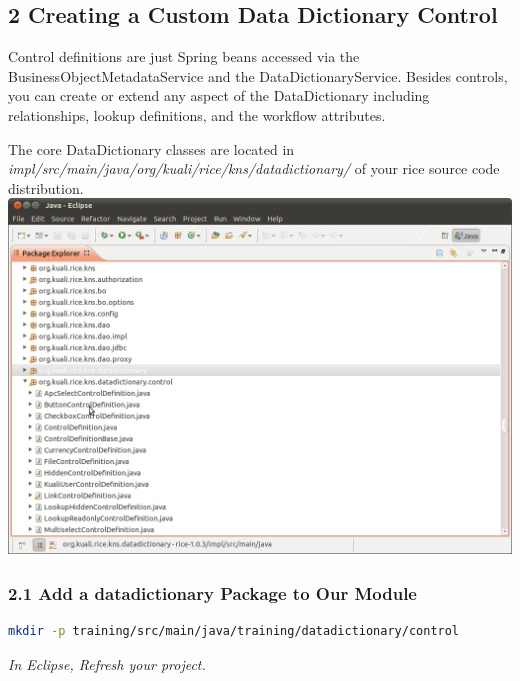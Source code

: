 \subsection*{2 Creating a Custom Data Dictionary Control}
Control definitions are just Spring beans accessed via the
BusinessObjectMetadataService and the DataDictionaryService. Besides
controls, you can create or extend any aspect of the DataDictionary
including relationships, lookup definitions, and the workflow
attributes.

The core DataDictionary classes are located in
\emph{impl/src/main/java/org/kuali/rice/kns/datadictionary/} of your
rice source code distribution.
\includegraphics[width=\textwidth]{images/Screenshot-Java - Eclipse .png}

\subsubsection*{2.1 Add a datadictionary Package to Our Module}

\begin{lstlisting}[basicstyle=\scriptsize,language=bash,backgroundcolor=\color{ubergray},caption={Directory creation for Linux
    users},frame=single,breaklines=true]
  mkdir -p training/src/main/java/training/datadictionary/control
\end{lstlisting}

\emph{In Eclipse, Refresh your project.}

